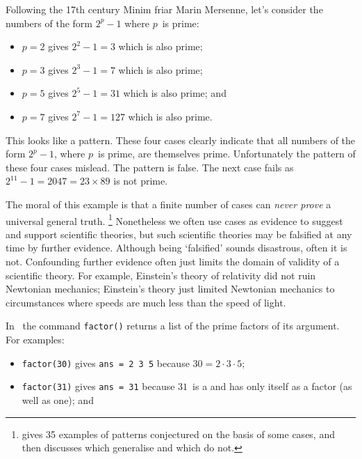 \begin{draft}
\begin{example}
Following the 17th century Minim friar Marin Mersenne, let's consider the numbers of the form \(2^p-1\) where \(p\)~is prime:
\begin{itemize}
\item \(p=2\) gives \(2^2-1=3\) which is also prime;
\item \(p=3\) gives \(2^3-1=7\) which is also prime;
\item \(p=5\) gives \(2^5-1=31\) which is also prime; and
\item \(p=7\) gives \(2^7-1=127\) which is also prime.
\end{itemize}
This looks like a pattern.
These four cases clearly indicate that all numbers of the form \(2^p-1\), where \(p\)~is prime, are themselves prime.
Unfortunately the pattern of these four cases mislead. 
The pattern is false.
The next case fails as \(2^{11}-1= 2047 =23\times 89\) is not prime.
\end{example}


The moral of this example is that a finite number of cases can \emph{never prove} a universal general truth.
\footnote{\cite{Guy88} gives 35 examples of patterns conjectured on the basis of some cases, and then discusses which generalise and which do not.}
Nonetheless we often use cases as evidence to suggest and support scientific theories, but such scientific theories may be falsified at any time by further evidence.
Although being `falsified' sounds disastrous, often it is not.
Confounding further evidence often just limits the domain of validity of a scientific theory.
For example, Einstein's theory of relativity did not ruin Newtonian mechanics; Einstein's theory just limited Newtonian mechanics to circumstances where speeds are much less than the speed of light.




\begin{example} \label{eg:}
In \script\ the command \verb|factor()| returns a list of the prime factors of its  argument.  
For examples: 
\begin{itemize}
\item \verb|factor(30)| gives \verb|ans = 2 3 5| because \(30=2\cdot3\cdot 5\);

\item \verb|factor(31)| gives \verb|ans = 31| because \(31\)~is a  and has only itself as a factor (as well as one); and


\end{itemize}
\end{example}
\end{draft}

